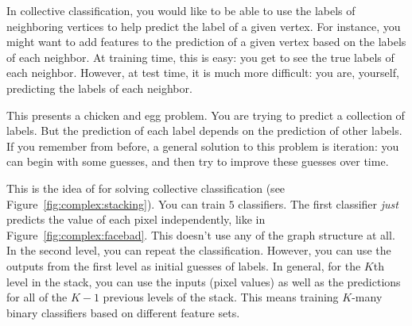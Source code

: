 
In collective classification, you would like to be able to use the
labels of neighboring vertices to help predict the label of a given
vertex.  For instance, you might want to add features to the prediction
of a given vertex based on the labels of each neighbor.  At training
time, this is easy: you get to see the true labels of each neighbor.
However, at test time, it is much more difficult: you are, yourself,
predicting the labels of each neighbor.

This presents a chicken and egg problem.  You are trying to predict a
collection of labels.  But the prediction of each label depends on the
prediction of other labels.  If you remember from before, a general
solution to this problem is iteration: you can begin with some
guesses, and then try to improve these guesses over time.


This is the idea of  for solving collective
classification (see Figure~\ref{fig:complex:stacking}).  You can train
$5$ classifiers.  The first classifier \emph{just} predicts the value
of each pixel independently, like in Figure~\ref{fig:complex:facebad}.
This doesn't use any of the graph structure at all.  In the second
level, you can repeat the classification.  However, you can use the
outputs from the first level as initial guesses of labels.  In
general, for the $K$th level in the stack, you can use the inputs
(pixel values) as well as the predictions for all of the $K-1$
previous levels of the stack.  This means training $K$-many binary
classifiers based on different feature sets.


